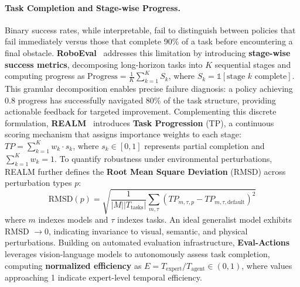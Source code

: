 \documentclass[acmsmall,screen,review,anonymous]{acmart}
\begin{document}
\paragraph{Task Completion and Stage-wise Progress.}
Binary success rates, while interpretable, fail to distinguish between policies that fail immediately versus those that complete 90\% of a task before encountering a final obstacle. \textbf{RoboEval}~\cite{wang2025roboeval} addresses this limitation by introducing \textbf{stage-wise success metrics}, decomposing long-horizon tasks into $K$ sequential stages and computing progress as $\text{Progress} = \frac{1}{K}\sum_{k=1}^K S_k$, where $S_k = \mathbb{1}[\text{stage } k \text{ complete}]$. This granular decomposition enables precise failure diagnosis: a policy achieving 0.8 progress has successfully navigated 80\% of the task structure, providing actionable feedback for targeted improvement. Complementing this discrete formulation, \textbf{REALM}~\cite{sedlacek2025realm} introduces \textbf{Task Progression} (TP), a continuous scoring mechanism that assigns importance weights to each stage: $TP = \sum_{k=1}^K w_k \cdot s_k$, where $s_k \in [0,1]$ represents partial completion and $\sum_{k=1}^K w_k = 1$. To quantify robustness under environmental perturbations, REALM further defines the \textbf{Root Mean Square Deviation} (RMSD) across perturbation types $p$:
\begin{equation}
  \text{RMSD}(p) = \sqrt{\frac{1}{|M||T_{\text{tasks}}|} \sum_{m,\tau} \left(TP_{m,\tau,p} - TP_{m,\tau,\text{default}}\right)^2}
\end{equation}
where $m$ indexes models and $\tau$ indexes tasks. An ideal generalist model exhibits RMSD $\to 0$, indicating invariance to visual, semantic, and physical perturbations. Building on automated evaluation infrastructure, \textbf{Eval-Actions}~\cite{liu2026evalactions} leverages vision-language models to autonomously assess task completion, computing \textbf{normalized efficiency} as $E = T_{\text{expert}}/T_{\text{agent}} \in (0,1)$, where values approaching 1 indicate expert-level temporal efficiency.
\end{document}
